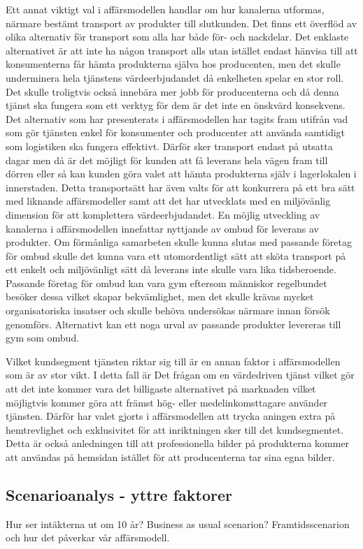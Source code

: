 \documentclass[10pt,a4paper,oneside]{article}
\begin{document}
Ett annat viktigt val i affärsmodellen handlar om hur kanalerna utformas, närmare bestämt transport av produkter till slutkunden. Det finns ett överflöd av olika alternativ för transport som alla har både för- och nackdelar. Det enklaste alternativet är att inte ha någon transport alls utan istället endast hänvisa till att konsumenterna får hämta produkterna själva hos producenten, men det skulle underminera hela tjänstens värdeerbjudandet då enkelheten spelar en stor roll. Det skulle troligtvis också innebära mer jobb för producenterna och då denna tjänst ska fungera som ett verktyg för dem är det inte en önskvärd konsekvens. Det alternativ som har presenterats i affärsmodellen har tagits fram utifrån vad som gör tjänsten enkel för konsumenter och producenter att använda samtidigt som logistiken ska fungera effektivt. Därför sker transport endast på utsatta dagar men då är det möjligt för kunden att få leverans hela vägen fram till dörren eller så kan kunden göra valet att hämta produkterna själv i lagerlokalen i innerstaden. Detta transportsätt har även valts för att konkurrera på ett bra sätt med liknande affärsmodeller samt att det har utvecklats med en miljövänlig dimension för att komplettera värdeerbjudandet. En möjlig utveckling av kanalerna i affärsmodellen innefattar nyttjande av ombud för leverans av produkter. Om förmånliga samarbeten skulle kunna slutas med passande företag för ombud skulle det kunna vara ett utomordentligt sätt att sköta transport på ett enkelt och miljövänligt sätt då leverans inte skulle vara lika tidsberoende. Passande företag för ombud kan vara gym eftersom människor regelbundet besöker dessa vilket skapar bekvämlighet, men det skulle krävas mycket organisatoriska insatser och skulle behöva undersökas närmare innan försök genomförs. Alternativt kan ett noga urval av passande produkter levereras till gym som ombud.

Vilket kundsegment tjänsten riktar sig till är en annan faktor i affärsmodellen som är av stor vikt. I detta fall är Det frågan om en värdedriven tjänst vilket gör att det inte kommer vara det billigaste alternativet på marknaden vilket möjligtvis kommer göra att främst hög- eller medelinkomsttagare använder tjänsten. Därför har valet gjorts i affärsmodellen att trycka aningen extra på hemtrevlighet och exklusivitet för att inriktningen sker till det kundsegmentet. Detta är också anledningen till att professionella bilder på produkterna kommer att användas på hemsidan istället för att producenterna tar sina egna bilder.


\subsection{Scenarioanalys  - yttre faktorer}
Hur ser intäkterna ut om 10 år?
Business as usual scenarion?
Framtidsscenarion och hur det påverkar vår affärsmodell. 
\end{document}
